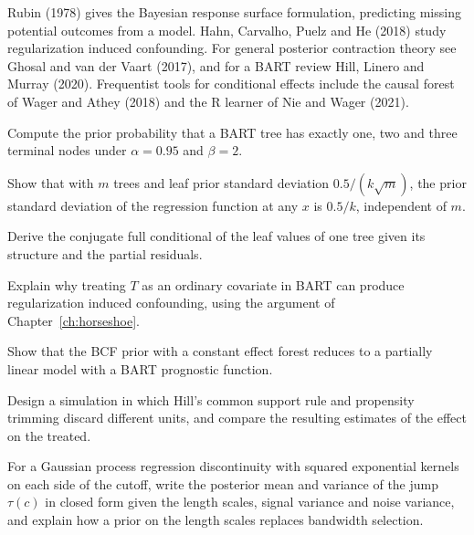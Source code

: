 Rubin (1978) gives the Bayesian response surface formulation, predicting missing potential outcomes from a model. Hahn, Carvalho, Puelz and He (2018) study regularization induced confounding. For general posterior contraction theory see Ghosal and van der Vaart (2017), and for a BART review Hill, Linero and Murray (2020). Frequentist tools for conditional effects include the causal forest of Wager and Athey (2018) and the R learner of Nie and Wager (2021).

\begin{exercises}
\item\label{ex:chbart:1} Compute the prior probability that a BART tree has exactly one, two and three terminal nodes under $\alpha = 0.95$ and $\beta = 2$.
\item\label{ex:chbart:2} Show that with $m$ trees and leaf prior standard deviation $0.5/(k\sqrt{m})$, the prior standard deviation of the regression function at any $x$ is $0.5/k$, independent of $m$.
\item\label{ex:chbart:3} Derive the conjugate full conditional of the leaf values of one tree given its structure and the partial residuals.
\item\label{ex:chbart:4} Explain why treating $T$ as an ordinary covariate in BART can produce regularization induced confounding, using the argument of Chapter~\ref{ch:horseshoe}.
\item\label{ex:chbart:5} Show that the BCF prior with a constant effect forest reduces to a partially linear model with a BART prognostic function.
\item\label{ex:chbart:6} Design a simulation in which Hill's common support rule and propensity trimming discard different units, and compare the resulting estimates of the effect on the treated.
\item\label{ex:chbart:7} For a Gaussian process regression discontinuity with squared exponential kernels on each side of the cutoff, write the posterior mean and variance of the jump $\tau(c)$ in closed form given the length scales, signal variance and noise variance, and explain how a prior on the length scales replaces bandwidth selection.
\end{exercises}
